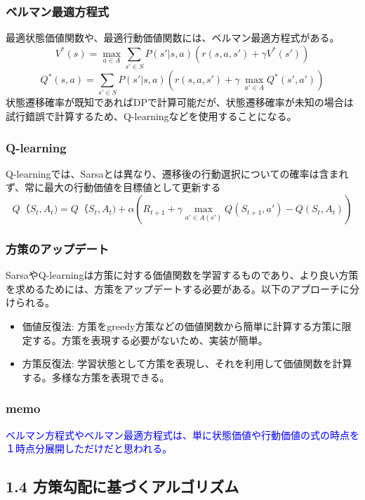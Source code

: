 \documentclass[]{jarticle}
\begin{document}
\subsubsection*{ベルマン最適方程式}
最適状態価値関数や、最適行動価値関数には、ベルマン最適方程式がある。
\begin{equation*}
V^{*}(s) = \underset{a \in A}{\max} \sum_{s'\in{S}} P(s' |s, a) (r(s,a,s') + \gamma V^{*}(s'))
\end{equation*}
\begin{equation*}
Q^{*}(s,a) = \sum_{s'\in{S}} P(s' |s, a) (r(s,a,s') + \gamma \: \underset{a' \in A}{\max} Q^{*}(s',a'))
\end{equation*}
状態遷移確率が既知であればDPで計算可能だが、状態遷移確率が未知の場合は試行錯誤で計算するため、Q-learningなどを使用することになる。

\subsubsection*{Q-learning}
Q-learningでは、Sarsaとは異なり、遷移後の行動選択についての確率は含まれず、常に最大の行動価値を目標値として更新する
\begin{equation*}
Q（S_t, A_t) = Q（S_t, A_t) + \alpha (R_{t+1} + \gamma \underset{a' \in A(s')}{\max} Q(S_{t+1},a') - Q(S_t, A_t))
\end{equation*}

\subsubsection*{方策のアップデート}
SarsaやQ-learningは方策に対する価値関数を学習するものであり、より良い方策を求めるためには、方策をアップデートする必要がある。以下のアプローチに分けられる。
\begin{itemize}
\item 価値反復法: 方策をgreedy方策などの価値関数から簡単に計算する方策に限定する。方策を表現する必要がないため、実装が簡単。
\item 方策反復法: 学習状態として方策を表現し、それを利用して価値関数を計算する。多様な方策を表現できる。
\end{itemize}

\subsubsection*{memo}
\textcolor{blue}{ベルマン方程式やベルマン最適方程式は、単に状態価値や行動価値の式の時点を１時点分展開しただけだと思われる。}

\subsection*{1.4 方策勾配に基づくアルゴリズム}
\end{document}
